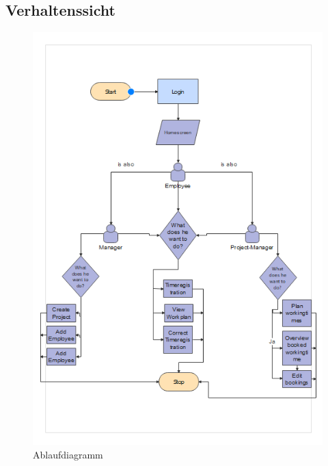 \documentclass{article}
\begin{document}
    \subsection{ Verhaltenssicht}
        \begin{figure}[h]
            \centering
            \includegraphics[scale=0.9]{images/Verhaltenssicht.png}
            \caption{Ablaufdiagramm}
            \label{fig:beispiel}
        \end{figure}
    \newpage
\end{document}
